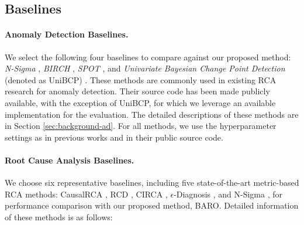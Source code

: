 \vspace{-0.2cm}
\subsection{Baselines} \label{sec:baselines}

\paragraph{Anomaly Detection Baselines.} We select the following four baselines to compare against our proposed method: \textit{N-Sigma} \cite{Jinjin2018Microscope, Li2022Circa}, \textit{BIRCH} \cite{zhang1996birch, wu2020microrca, wu2021microdiag}, \textit{SPOT} \cite{siffer2017anomaly, pan2021dycauserca, Li2022Circa, lee2023eadro, Meng2020Microcause}, and \textit{Univariate Bayesian Change Point Detection} (denoted as UniBCP) \cite{adams2007bayesian, Chen2014Causeinfer, chen2016causeinfer}. These methods are commonly used in existing RCA research for anomaly detection. Their source code has been made publicly available, with the exception of UniBCP, for which we leverage an available implementation \cite{unibcp} for the evaluation. The detailed descriptions of these methods are in Section \ref{sec:background-ad}. For all methods, we use the hyperparameter settings as in previous works and in their public source code. 


\vspace{-0.2cm}
\paragraph{Root Cause Analysis Baselines.} We choose six representative baselines, including five state-of-the-art metric-based RCA methods: CausalRCA \cite{Xin2023CausalRCA}, RCD \cite{Azam2022rcd}, CIRCA \cite{Li2022Circa}, $\epsilon$-Diagnosis \cite{Shan2019Ediagnosis}, and N-Sigma \cite{Li2022Circa}, for performance comparison with our proposed method, BARO. Detailed information of these methods is as follows:

